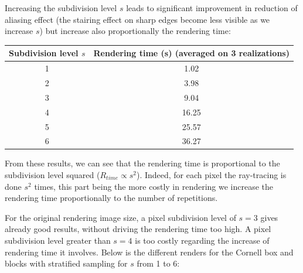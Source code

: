 \documentclass[a4,12pt]{article}
\begin{document}
	Increasing the subdivision level $s$ leads to significant improvement in reduction of aliasing effect (the stairing effect on sharp edges become less visible as we increase $s$) but increase also proportionally the rendering time:
	
	\begin{center}
	\begin{tabular}{|c|c|}
		\hline
		Subdivision level $s$ & Rendering time (s) (averaged on 3 realizations)\\ \hline
		1 & 1.02\\ \hline
		2 & 3.98\\ \hline
		3 & 9.04\\ \hline
		4 & 16.25\\ \hline
		5 & 25.57\\ \hline
		6 & 36.27\\ \hline
	\end{tabular}
	\end{center}
	
	From these results, we can see that the rendering time is proportional to the subdivision level squared ($R_{time} \propto s^2$). Indeed, for each pixel the ray-tracing is done $s^2$ times, this part being the more costly in rendering we increase the rendering time proportionally to the number of repetitions.
	
	For the original rendering image size, a pixel subdivision level of $s = 3$ gives already good results, without driving the rendering time too high. A pixel subdivision level greater than $s = 4$ is too costly regarding the increase of rendering time it involves. Below is the different renders for the Cornell box and blocks with stratified sampling for $s$ from 1 to 6:
	
\end{document}
